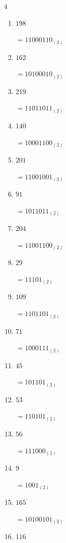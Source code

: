 \begin{multicols}{4}
\begin{enumerate}
        $=11000011_{(2)}$

  \item $198$

        $=11000110_{(2)}$

  \item $162$

        $=10100010_{(2)}$

  \item $219$

        $=11011011_{(2)}$

  \item $140$

        $=10001100_{(2)}$

  \item $201$

        $=11001001_{(2)}$

  \item $91$

        $=1011011_{(2)}$

  \item $204$

        $=11001100_{(2)}$

  \item $29$

        $=11101_{(2)}$

  \item $109$

        $=1101101_{(2)}$

  \item $71$

        $=1000111_{(2)}$

  \item $45$

        $=101101_{(2)}$

  \item $53$

        $=110101_{(2)}$

  \item $56$

        $=111000_{(2)}$

\columnbreak %

\resetques

  \item $9$

        $=1001_{(2)}$

  \item $165$

        $=10100101_{(2)}$

  \item $116$


\end{enumerate}
\end{multicols}
